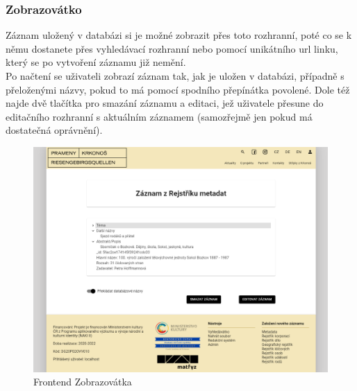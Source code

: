 \subsubsection{Zobrazovátko}
Záznam uložený v databázi si je možné zobrazit přes toto rozhranní, poté co
se k němu dostanete přes vyhledávací rozhranní nebo pomocí unikátního
url linku, který se po vytvoření záznamu již nemění.\\
Po načtení se uživateli zobrazí záznam tak, jak je uložen v databázi, případně
s přeloženými názvy, pokud to má pomocí spodního přepínátka povolené.
Dole též najde dvě tlačítka pro smazání záznamu a editaci, jež uživatele
přesune do editačního rozhranní s aktuálním záznamem (samozřejmě jen pokud 
má dostatečná oprávnění).
\begin{figure}[H]
	\centering
	\includegraphics[width=.8\linewidth]{img/showScene.png}
	\caption{Frontend Zobrazovátka}
\end{figure}


